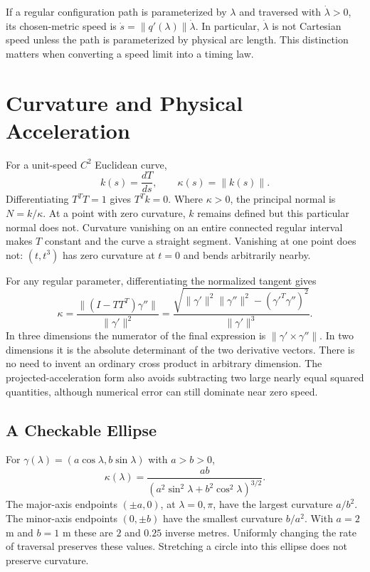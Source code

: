\documentclass[12pt, openany]{book}
\theoremstyle{plain}
\begin{document}
If a regular configuration path is parameterized by $\lambda$ and traversed
with $\dot\lambda>0$, its chosen-metric speed is
$\dot s=\|q'(\lambda)\|\dot\lambda$. In particular, $\dot\lambda$ is not
Cartesian speed unless the path is parameterized by physical arc length.
This distinction matters when converting a speed limit into a timing law.

\section{Curvature and Physical Acceleration}

For a unit-speed $C^2$ Euclidean curve,
\begin{equation}\label{eq:curvature_def}
 k(s)=\frac{dT}{ds},\qquad \kappa(s)=\|k(s)\|.
\end{equation}
Differentiating $T^TT=1$ gives $T^Tk=0$. Where $\kappa>0$, the principal
normal is $N=k/\kappa$. At a point with zero curvature, $k$ remains defined
but this particular normal does not. Curvature vanishing on an entire
connected regular interval makes $T$ constant and the curve a straight
segment. Vanishing at one point does not: $(t,t^3)$ has zero curvature at
$t=0$ and bends arbitrarily nearby.

For any regular parameter, differentiating the normalized tangent gives
\begin{equation}\label{eq:curvature_general_n}
 \kappa=\frac{\|(I-TT^T)\gamma''\|}{\|\gamma'\|^2}
 =\frac{\sqrt{\|\gamma'\|^2\|\gamma''\|^2-(\gamma'^T\gamma'')^2}}
 {\|\gamma'\|^3}.
\end{equation}
In three dimensions the numerator of the final expression is
$\|\gamma'\times\gamma''\|$. In two dimensions it is the absolute determinant
of the two derivative vectors. There is no need to invent an ordinary cross
product in arbitrary dimension. The projected-acceleration form also avoids
subtracting two large nearly equal squared quantities, although numerical
error can still dominate near zero speed.

\subsection{A Checkable Ellipse}

For $\gamma(\lambda)=(a\cos\lambda,b\sin\lambda)$ with $a>b>0$,
\begin{equation}
 \kappa(\lambda)=\frac{ab}
 {(a^2\sin^2\lambda+b^2\cos^2\lambda)^{3/2}}.
\end{equation}
The major-axis endpoints $(\pm a,0)$, at $\lambda=0,\pi$, have the largest
curvature $a/b^2$. The minor-axis endpoints $(0,\pm b)$ have the smallest
curvature $b/a^2$. With $a=2$ m and $b=1$ m these are $2$ and $0.25$ inverse
metres. Uniformly changing the rate of traversal preserves these values.
Stretching a circle into this ellipse does not preserve curvature.
\end{document}

